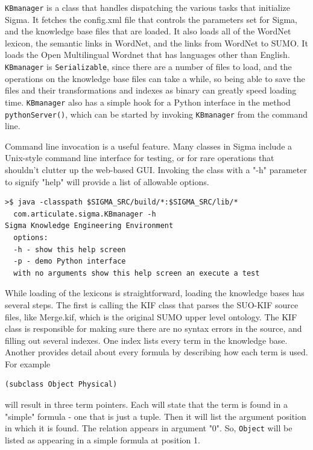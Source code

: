 \documentclass{book}
\begin{document}
\texttt{KBmanager} is a class that handles dispatching
the various tasks that initialize Sigma.  It fetches the config.xml file that
controls the parameters set for Sigma, and the knowledge base files that are
loaded. It also loads all of the WordNet lexicon, the semantic links in WordNet,
and the links from WordNet to SUMO.  It loads the Open Multilingual Wordnet that
has languages other than English.  \texttt{KBmanager} is \texttt{Serializable},
since there are a number of files to load, and the operations on the knowledge
base files can take a while, so being able to save the files and their
transformations and indexes as binary can greatly speed loading time.
\texttt{KBmanager} also has a simple hook for a Python interface in the method
\texttt{pythonServer()}, which can be started by invoking \texttt{KBmanager}
from the command line.

Command line invocation is a useful feature.  Many classes in Sigma include a 
Unix-style command line interface for testing, or for rare operations that
shouldn't clutter up the web-based GUI.  Invoking the class with a "-h" 
parameter to signify "help" will provide a list of allowable options.

\begin{lstlisting}[basicstyle=\ttfamily\small\bfseries]
>$ java -classpath $SIGMA_SRC/build/*:$SIGMA_SRC/lib/* 
  com.articulate.sigma.KBmanager -h
Sigma Knowledge Engineering Environment
  options:
  -h - show this help screen
  -p - demo Python interface
  with no arguments show this help screen an execute a test
\end{lstlisting}

While loading of the lexicons is straightforward, loading the knowledge bases
has several steps.  The first is calling the KIF class that parses the SUO-KIF
source files, like Merge.kif, which is the original SUMO upper level ontology.
The KIF class is responsible for making sure there are no syntax errors in the
source, and filling out several indexes.  One index lists every term in the
knowledge base.  Another provides detail about every formula by describing
how each term is used.  For example

\begin{lstlisting}[basicstyle=\ttfamily\small\bfseries]
(subclass Object Physical)
\end{lstlisting}

will result in three term pointers.  Each will state that the term is found
in a "simple" formula - one that is just a tuple.  Then it will list the argument
position in which it is found.  The relation appears in argument "0".  So,
\texttt{Object} will be listed as appearing in a simple formula at position 1.
\end{document}
